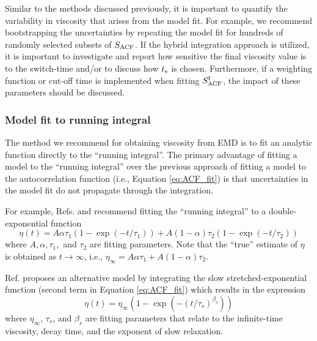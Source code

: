 \documentclass[9pt,bestpractices]{livecoms}
\begin{document}
Similar to the methods discussed previously, it is important to quantify the variability in viscosity that arises from the model fit. For example, we recommend bootstrapping the uncertainties by repeating the model fit for hundreds of randomly selected subsets of $S_{\rm ACF}$. If the hybrid integration approach is utilized, it is important to investigate and report how sensitive the final viscosity value is to the switch-time and/or to discuss how $t_{\rm s}$ is chosen. Furthermore, if a weighting function or cut-off time is implemented when fitting $S^{\rm f}_{\rm ACF}$, the impact of these parameters should be discussed.

%
%

%

\subsubsection*{Model fit to running integral}

The method we recommend for obtaining viscosity from EMD is to fit an analytic function directly to the ``running integral''. The primary advantage of fitting a model to the ``running integral'' over the previous approach of fitting a model to the autocorrelation function (i.e., Equation \ref{eq:ACF_fit}) is that uncertainties in the model fit do not propagate through the integration. 

For example, Refs. \cite{ReyCastro2006} and \cite{Zhang2015} recommend fitting the ``running integral'' to a double-exponential function \begin{equation} \label{eq: Double exponential}
\eta(t) = A \alpha \tau_1 \left(1-\exp{(-t/\tau_1)}\right) + A (1-\alpha) \tau_2 \left(1-\exp{(-t/\tau_2)}\right)
\end{equation}
where $A, \alpha, \tau_1, $ and $\tau_2$ are fitting parameters. Note that the ``true'' estimate of $\eta$ is obtained as $t \to \infty$, i.e., $\eta_\infty = A \alpha \tau_1 + A (1-\alpha) \tau_2$. 

Ref. \cite{Borodin2009} proposes an alternative model by integrating the slow stretched-exponential function (second term in Equation \ref{eq:ACF_fit}) which results in the expression
\begin{equation} \label{eq:Borodin}
\eta(t) = \eta_\infty (1- \exp(-(t/\tau_s)^{\beta_s}))
\end{equation}
where $\eta_\infty$, $\tau_s$, and $\beta_s$ are fitting parameters that relate to the infinite-time viscosity, decay time, and the exponent of slow relaxation. 
\end{document}
